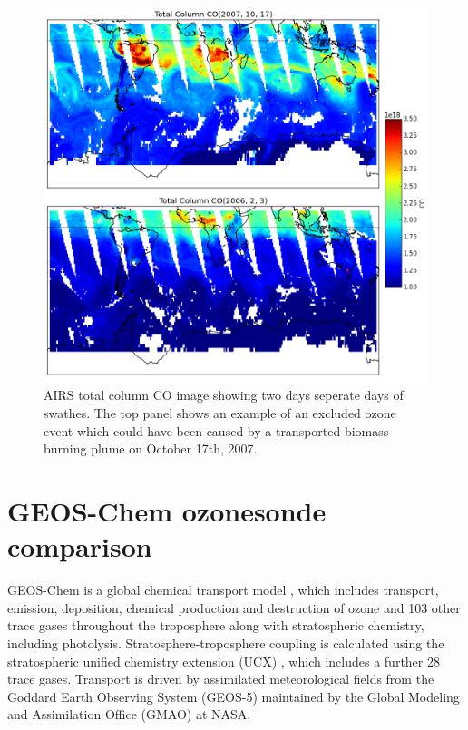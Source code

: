     \begin{figure}[!htbp]
      \includegraphics[width=\textwidth]{Figures/Ozone/AIRS_compare.png}
      \caption{AIRS total column CO image showing two days seperate days of swathes. The top panel shows an example of an excluded ozone event which could have been caused by a transported biomass burning plume on October 17th, 2007.}
      \label{ch_o3:fig:excludedeg}
    \end{figure}

  
\section{GEOS-Chem ozonesonde comparison}
  GEOS-Chem is a global chemical transport model \citep{Bey2001}, which includes transport, emission, deposition, chemical production and destruction of ozone and 103 other trace gases throughout the troposphere along with stratospheric chemistry, including photolysis. 
  Stratosphere-troposphere coupling is calculated using the stratospheric unified chemistry extension (UCX) \citep{Eastham2014}, which includes a further 28 trace gases.
  Transport is driven by assimilated meteorological fields from the Goddard Earth Observing System (GEOS-5) maintained by the Global Modeling and Assimilation Office (GMAO) at NASA.
  
